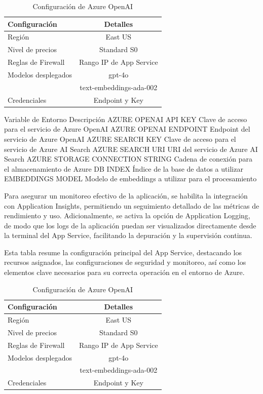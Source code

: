 \begin{table}[h]
	\centering
	\caption[Configuración de Azure OpenAI]{Configuración de Azure OpenAI}
	\begin{tabular}{l c}    
		\toprule
		\textbf{Configuración} 	 & \textbf{Detalles} 	\\
		\midrule
		Región              &	East US 				        \\		
		Nivel de precios    & Standard S0				      \\
		Reglas de Firewall  & Rango IP de App Service \\
    Modelos desplegados	& gpt-4o				          \\
            	          & text-embeddings-ada-002	\\
    Credenciales	      & Endpoint y Key 		      \\
		\bottomrule
		\hline
	\end{tabular}
	\label{tab:config-openai}
\end{table}

Variable de Entorno	Descripción
AZURE OPENAI API KEY	Clave de acceso para el servicio de Azure OpenAI
AZURE OPENAI ENDPOINT	Endpoint del servicio de Azure OpenAI
AZURE SEARCH KEY	Clave de acceso para el servicio de Azure AI Search
AZURE SEARCH URI	URI del servicio de Azure AI Search
AZURE STORAGE CONNECTION STRING	Cadena de conexión para el almacenamiento de Azure
DB INDEX	Índice de la base de datos a utilizar
EMBEDDINGS MODEL	Modelo de embeddings a utilizar para el procesamiento

Para asegurar un monitoreo efectivo de la aplicación, se habilita la integración con Application Insights, permitiendo un seguimiento detallado de las métricas de rendimiento y uso. Adicionalmente, se activa la opción de Application Logging, de modo que los logs de la aplicación puedan ser visualizados directamente desde la terminal del App Service, facilitando la depuración y la supervisión continua.

Esta tabla resume la configuración principal del App Service, destacando los recursos asignados, las configuraciones de seguridad y monitoreo, así como los elementos clave necesarios para su correcta operación en el entorno de Azure.

\begin{table}[h]
	\centering
	\caption[Configuración de Azure OpenAI]{Configuración de Azure OpenAI}
	\begin{tabular}{l c}    
		\toprule
		\textbf{Configuración} 	 & \textbf{Detalles} 	\\
		\midrule
		Región              &	East US 				        \\		
		Nivel de precios    & Standard S0				      \\
		Reglas de Firewall  & Rango IP de App Service \\
    Modelos desplegados	& gpt-4o				          \\
            	          & text-embeddings-ada-002	\\
    Credenciales	      & Endpoint y Key 		      \\
		\bottomrule
		\hline
	\end{tabular}
	\label{tab:config-openai}
\end{table}

